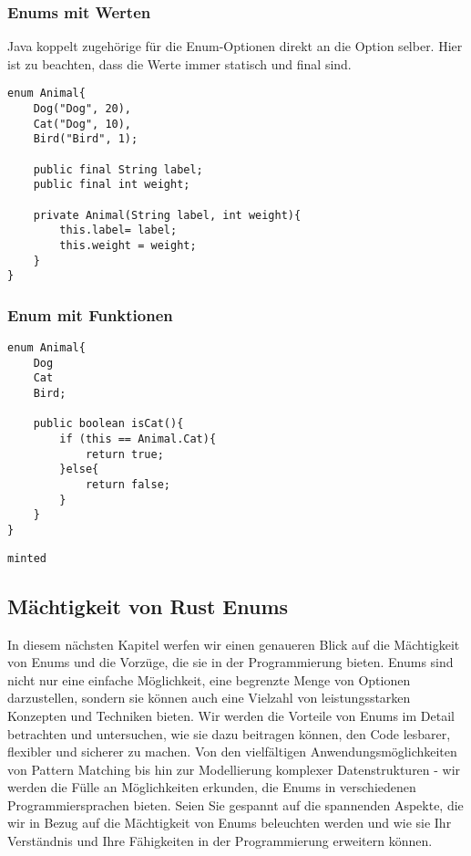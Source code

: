 \documentclass[a4paper, 1ppt]{article}
\begin{document}
\subsubsection{Enums mit Werten}
Java koppelt zugehörige für die Enum-Optionen direkt an die Option selber.
Hier ist zu beachten, dass die Werte immer statisch und final sind.
\begin{verbatim}
enum Animal{
    Dog("Dog", 20),
    Cat("Dog", 10),
    Bird("Bird", 1);

    public final String label;
    public final int weight;

    private Animal(String label, int weight){
        this.label= label;
        this.weight = weight;
    }
}
\end{verbatim}
\subsubsection{Enum mit Funktionen}
\begin{verbatim}
enum Animal{
    Dog
    Cat
    Bird;

    public boolean isCat(){
        if (this == Animal.Cat){
            return true;
        }else{
            return false;
        }
    }
}
\end{verbatim}
\begin{verbatim}
minted\end{verbatim}
\subsection{Mächtigkeit von Rust Enums}
In diesem nächsten Kapitel werfen wir einen genaueren Blick auf die Mächtigkeit von Enums und die Vorzüge, die sie in der Programmierung bieten. Enums sind nicht nur eine einfache Möglichkeit, eine begrenzte Menge von Optionen darzustellen, sondern sie können auch eine Vielzahl von leistungsstarken Konzepten und Techniken bieten. Wir werden die Vorteile von Enums im Detail betrachten und untersuchen, wie sie dazu beitragen können, den Code lesbarer, flexibler und sicherer zu machen. Von den vielfältigen Anwendungsmöglichkeiten von Pattern Matching bis hin zur Modellierung komplexer Datenstrukturen - wir werden die Fülle an Möglichkeiten erkunden, die Enums in verschiedenen Programmiersprachen bieten. Seien Sie gespannt auf die spannenden Aspekte, die wir in Bezug auf die Mächtigkeit von Enums beleuchten werden und wie sie Ihr Verständnis und Ihre Fähigkeiten in der Programmierung erweitern können.
\end{document}
